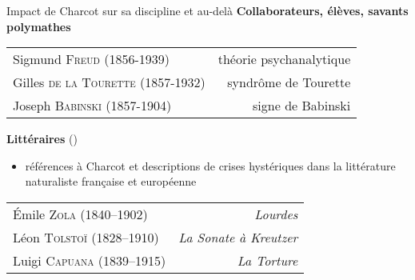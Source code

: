 \begin{frame}{Impact de Charcot sur sa discipline et au-delà}
\textbf{Collaborateurs, élèves, savants polymathes}
\centering
    \begin{table}[!ht]
        \centering
        \begin{tabular}{l r}
           Sigmund \textsc{Freud} (1856-1939)  & théorie psychanalytique \\
            Gilles \textsc{de la Tourette} (1857-1932) & syndrôme de Tourette \\
            Joseph \textsc{Babinski} (1857-1904) & signe de Babinski \\
        \end{tabular}
        \label{tab:my_label}
    \end{table}
\medskip
\textbf{Littéraires} (\cite{koehler2013charcot}) 
\begin{itemize}
\item références à Charcot et descriptions de crises hystériques dans la littérature naturaliste française et européenne
\end{itemize}
\begin{table}[!ht]
    \centering
    \begin{tabular}{l r}
        Émile \textsc{Zola} (1840–1902)  & \textit{Lourdes} \\
        Léon \textsc{Tolstoï} (1828–1910) & \textit{La Sonate à Kreutzer} \\
        Luigi \textsc{Capuana} (1839–1915) & \textit{La Torture}
    \end{tabular}
    \label{tab:my_label}
\end{table}

\end{frame}

